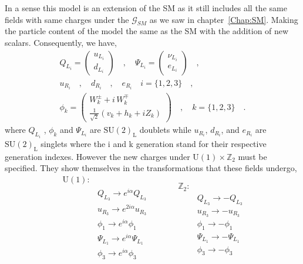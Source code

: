 In a sense this model is an extension of the SM as it still includes all the same fields with same charges under the $\mathcal{G}_{SM}$ as we saw in chapter~\ref{Chap:SM}. 
% 
Making the particle content of the model the same as the SM with the addition of new scalars. 
%
Consequently, we have,
%
\begin{equation}
\label{eq:3HDM_Fields}
\begin{gathered}
Q_{L_i} =  \begin{pmatrix}
u_{L_i}  \\
d_{L_i}
\end{pmatrix} \quad , \quad \Psi_{L_i} =  \begin{pmatrix}
\nu_{L_i}  \\
e_{L_i}
\end{pmatrix} \quad , \quad \\ 
u_{R_i} \quad , \quad d_{R_i} \quad , \quad e_{R_i} \quad i=\{1,2,3\} \quad ,  \\  
\phi_k = \begin{pmatrix}
W_k^\pm + i \, W_k^\mp \\ 
\frac{1}{\sqrt{2}}\left( v_k + h_k + i Z_k \right) 
\end{pmatrix}  \quad , \quad k=\{ 1,2,3\} \quad . 
\end{gathered} 
\end{equation}
%
where $Q_{L_i}$ , $\phi_k$ and $\Psi_{L_i}$ are $\mathrm{SU(2)_L}$ doublets while $u_{R_i}$, $d_{R_i}$, and $e_{R_i}$ are $\mathrm{SU(2)_L}$ singlets where the i and k generation stand for their respective generation indexes. 
%
However the new charges under $\mathrm{U(1)}\times\mathbb{Z}_2$ must be specified. 
%
They show themselves in the transformations that these fields undergo, 
%
\begin{equation}
\label{eq:3HDM_Transformations}
	\begin{split} 
	\mathrm{U(1)} : & \\
		& Q_{L_3} \rightarrow    e^{i \alpha} Q_{L_3}  \\  
		& u_{R_3} \rightarrow    e^{2 i \alpha} u_{R_3}  \\
		& \phi_1  \rightarrow    e^{i \alpha} \phi_1  \\   
		& \Psi_{L_1} \rightarrow e^{i \alpha} \Psi_{L_1} \\
		& \phi_3 \rightarrow     e^{i \alpha} \phi_3  \\ 
	\end{split} \quad \quad \quad  
	\begin{split}
		\mathbb{Z}_2 : & \\
		 	& Q_{L_3} \rightarrow -Q_{L_3} \\
		 	& u_{R_3} \rightarrow -u_{R_3} \\ 
		 	& \phi_1  \rightarrow -\phi_1 \\ 
		 	& \Psi_{L_1} \rightarrow - \Psi_{L_1} \\ 
		 	& \phi_3 \rightarrow -\phi_3
	\end{split} 
\end{equation} 
